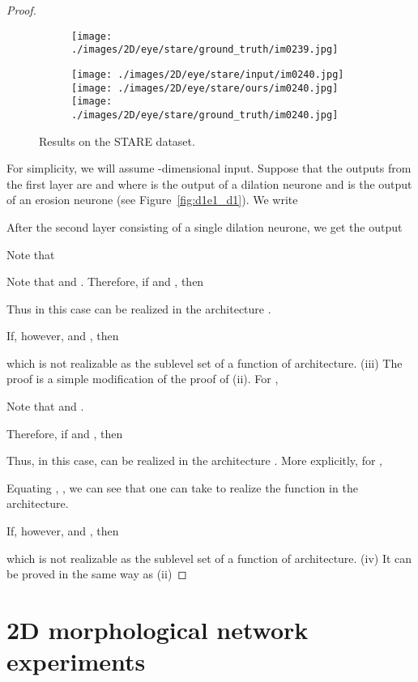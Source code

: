 \documentclass[12pt]{article}
\begin{document}
\begin{proof}
\begin{figure*}[th!]
\begin{subfigure}[t]{0.22\linewidth}
\texttt{[image: ./images/2D/eye/stare/ground\_truth/im0239.jpg]}
\caption{}
\end{subfigure}
\begin{subfigure}[t]{0.22\linewidth}
\texttt{[image: ./images/2D/eye/stare/input/im0240.jpg]}
\texttt{[image: ./images/2D/eye/stare/ours/im0240.jpg]}
\texttt{[image: ./images/2D/eye/stare/ground\_truth/im0240.jpg]}
\caption{}
\end{subfigure}
\caption{Results on the STARE dataset.}
\label{fig:failure_cases_stare}
\end{figure*}
For simplicity, we will assume -dimensional input. Suppose that the outputs from the first layer are  and  where  is the output of a dilation neurone and  is the output of an erosion neurone (see Figure~\ref{fig:d1e1_d1}). We write

After the second layer consisting of a single dilation neurone, we get the output

Note that

Note that  and .
Therefore, if  and , then

Thus in this case  can be realized in the architecture .

If, however,  and , then

which is not realizable as the sublevel set of a function of  architecture.
\vskip10pt
\noindent
(iii) 
The proof is a simple modification of the proof of (ii). For ,

Note that  and .

Therefore, if  and , then

Thus, in this case,  can be realized in the architecture . More explicitly, for ,

Equating , , we can see that one can take  to realize the function  in the  architecture.

If, however,  and , then

which is not realizable as the sublevel set of a function of  architecture.
\vskip10pt
\noindent
(iv) It can be proved in the same way as (ii)
\end{proof}

\section{2D morphological network experiments}
\end{document}
